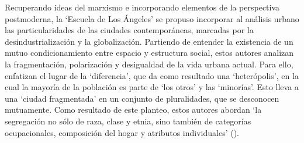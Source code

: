\documentclass[
  spanish,
  a4paper,%
  chapterprefix=true,%
  DIV=calc,%
  twoside]{scrbook}%
\begin{document}
Recuperando ideas del marxismo e incorporando elementos de la
perspectiva postmoderna, la `Escuela de Los Ángeles' se propuso
incorporar al análisis urbano las particularidades de las ciudades
contemporáneas, marcadas por la desindustrialización y la globalización.
Partiendo de entender la existencia de un mutuo condicionamiento entre
espacio y estructura social, estos autores analizan la fragmentación,
polarización y desigualdad de la vida urbana actual. Para ello,
enfatizan el lugar de la `diferencia', que da como resultado una
`heterópolis', en la cual la mayoría de la población es parte de `los
otros' y las `minorías'. Esto lleva a una `ciudad fragmentada' en un
conjunto de pluralidades, que se desconocen mutuamente. Como resultado
de este planteo, estos autores abordan `la segregación no sólo de raza,
clase y etnia, sino también de categorías ocupacionales, composición del
hogar y atributos individuales' ().
\end{document}
